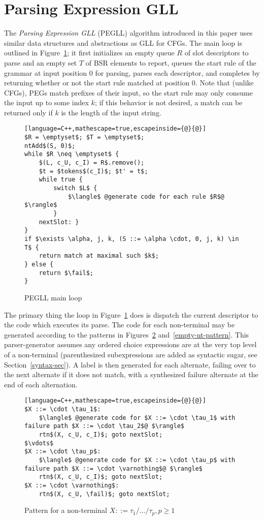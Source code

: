 \documentclass{article}
\newcommand{\fail}{\mathsf{fail}}
\begin{document}
\section{Parsing Expression GLL}
The \emph{Parsing Expression GLL} (PEGLL) algorithm introduced in this paper uses similar data structures and abstractions as GLL for CFGs. 
The main loop is outlined in Figure~\ref{main-loop-algo}; it first initializes an empty queue $R$ of slot descriptors to parse and an empty set $T$ of BSR elements to report, queues the start rule of the grammar at input position 0 for parsing, parses each descriptor, and completes by returning whether or not the start rule matched at position 0. 
Note that (unlike CFGs), PEGs match prefixes of their input, so the start rule may only consume the input up to some index $k$; if this behavior is not desired, a match can be returned only if $k$ is the length of the input string.

\begin{figure}
\caption{PEGLL main loop} \label{main-loop-algo}
\begin{lstlisting}[language=C++,mathescape=true,escapeinside={@}{@}]
$R = \emptyset$; $T = \emptyset$;
ntAdd$(S, 0)$;
while $R \neq \emptyset$ {
    $(L, c_U, c_I) = R$.remove();
    $t = $tokens$(c_I)$; $t' = t$;
    while true {
        switch $L$ {
            $\langle$ @generate code for each rule $R$@ $\rangle$
        }
    nextSlot: }
}
if $\exists \alpha, j, k, (S ::= \alpha \cdot, 0, j, k) \in T$ {
    return match at maximal such $k$;
} else {
    return $\fail$;
}
\end{lstlisting}
\end{figure}

The primary thing the loop in Figure~\ref{main-loop-algo} does is dispatch the current descriptor to the code which executes its parse. 
The code for each non-terminal may be generated according to the patterns in Figures~\ref{nt-pattern} and~\ref{empty-nt-pattern}. 
This parser-generator assumes any ordered choice expressions are at the very top level of a non-terminal (parenthesized subexpressions are added as syntactic sugar, see Section~\ref{syntax-sec}). 
A label is then generated for each alternate, failing over to the next alternate if it does not match, with a synthesized failure alternate at the end of each alternation.

\begin{figure}
\caption[Non-terminal code pattern]{Pattern for a non-terminal $X ::= \tau_1 / \ldots / \tau_p, p \geq 1$} \label{nt-pattern}
\begin{lstlisting}[language=C++,mathescape=true,escapeinside={@}{@}]
$X ::= \cdot \tau_1$:
	$\langle$ @generate code for $X ::= \cdot \tau_1$ with failure path $X ::= \cdot \tau_2$@ $\rangle$
	rtn$(X, c_U, c_I)$; goto nextSlot;
$\vdots$
$X ::= \cdot \tau_p$:
	$\langle$ @generate code for $X ::= \cdot \tau_p$ with failure path $X ::= \cdot \varnothing$@ $\rangle$
	rtn$(X, c_U, c_I)$; goto nextSlot;
$X ::= \cdot \varnothing$:
	rtn$(X, c_U, \fail)$; goto nextSlot;
\end{lstlisting}
\end{figure}
\end{document}
